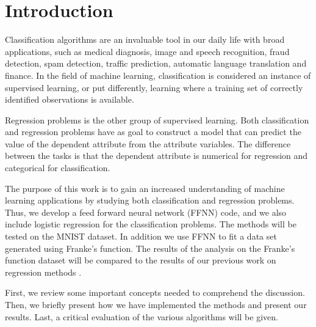 \documentclass[../main.tex]{subfiles}
\begin{document}
\section{Introduction}
Classification algorithms are an invaluable tool in our daily life with broad applications, such as medical diagnosis, image and speech recognition, fraud detection, spam detection, traffic prediction, automatic language translation and finance. In the field of machine learning, classification is considered an instance of supervised learning, or put differently, learning where a training set of correctly identified observations is available.

Regression problems is the other group of supervised learning. Both classification and regression problems have as goal to construct a model that can predict the value of the dependent attribute from the attribute variables. The difference between the tasks is that the dependent attribute is numerical for regression and categorical for classification.

The purpose of this work is to gain an increased understanding of machine learning applications by studying both classification and regression problems. Thus, we develop a feed forward neural network (FFNN) code, and we also include logistic regression for the classification problems. The methods will be tested on the MNIST dataset. In addition we use FFNN to fit a data set generated using Franke’s function. The results of the analysis on the Franke's function dataset will be compared to the results of our previous work on regression methods \cite{project1}. 

First, we review some important concepts needed to comprehend the discussion. Then, we briefly present how we have implemented the methods and present our results.  Last, a critical evaluation of the various algorithms will be given. 
\end{document}
